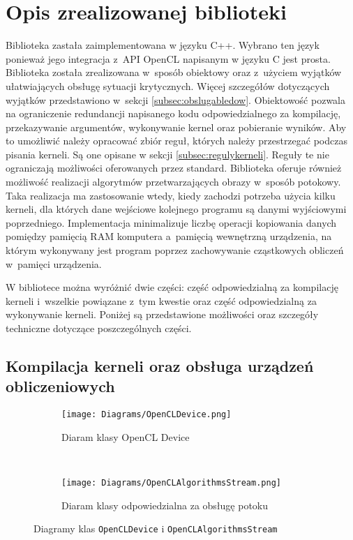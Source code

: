 \section{Opis zrealizowanej biblioteki}  
\label{sec:biblioteka}

Biblioteka zastała zaimplementowana w języku C++. Wybrano ten język ponieważ jego integracja z~API OpenCL napisanym w języku C jest prosta. Biblioteka została zrealizowana w~sposób obiektowy oraz z~użyciem wyjątków ułatwiających obsługę sytuacji krytycznych. Więcej szczegółów dotyczących wyjątków przedstawiono w~sekcji \ref{subsec:obslugabledow}. Obiektowość pozwala na ograniczenie redundancji napisanego kodu odpowiedzialnego za kompilację, przekazywanie argumentów, wykonywanie kernel oraz pobieranie wyników. Aby to umożliwić należy opracować zbiór reguł, których należy przestrzegać podczas pisania kerneli. Są one opisane w sekcji \ref{subsec:regulykerneli}. Reguły te nie ograniczają możliwości oferowanych przez standard. Biblioteka oferuje również możliwość realizacji algorytmów przetwarzających obrazy w~sposób potokowy. Taka realizacja ma zastosowanie wtedy, kiedy zachodzi potrzeba użycia kilku kerneli, dla których dane wejściowe kolejnego programu są danymi wyjściowymi poprzedniego. Implementacja minimalizuje liczbę operacji kopiowania danych pomiędzy pamięcią RAM komputera a~pamięcią wewnętrzną urządzenia, na którym wykonywany jest program poprzez zachowywanie cząstkowych obliczeń w~pamięci urządzenia.

W bibliotece można wyróżnić dwie części: część odpowiedzialną za kompilację kerneli i~wszelkie powiązane z~tym kwestie oraz część odpowiedzialną za wykonywanie kerneli.
Poniżej są przedstawione możliwości oraz szczegóły techniczne dotyczące poszczególnych części.

\subsection{Kompilacja kerneli oraz obsługa urządzeń obliczeniowych}
\label{subsec:kompilacjakerneli}

\begin{figure}[h]

\begin{center}
\begin{subfigure}[t]{0.3\textwidth}
\texttt{[image: Diagrams/OpenCLDevice.png]}
\caption{Diaram klasy OpenCL Device}
\label{fig:opencldevice}
\end{subfigure}
~
\begin{subfigure}[t]{0.3\textwidth}
\texttt{[image: Diagrams/OpenCLAlgorithmsStream.png]}
\caption{Diaram klasy odpowiedzialna za obsługę potoku}
\label{fig:openCLAlgorithmsStream}
\end{subfigure}
\end{center}

\caption{Diagramy klas \texttt{OpenCLDevice} i \texttt{OpenCLAlgorithmsStream}}
\label{fig:opencldeviceIopenCLAglorithmsStream}
\end{figure}

